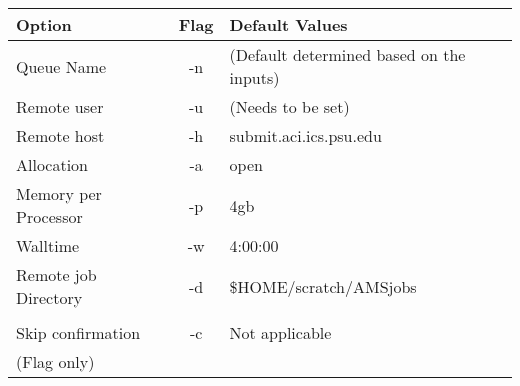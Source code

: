 \begin{table}[H]
    \centering
    \begin{tabular}{|l|c|l|}
    \hline
    Option               & \multicolumn{1}{l|}{Flag} & Default Values                           \\ \hline
    Queue Name           & -n                        & (Default determined based on the inputs) \\
    Remote user          & -u                        & (Needs to be set)                        \\
    Remote host          & -h                        & submit.aci.ics.psu.edu                   \\
    Allocation           & -a                        & open                                     \\
    Memory per Processor & -p                        & 4gb                                      \\
    Walltime             & -w                        & 4:00:00                                  \\
    Remote job Directory & -d   & \$HOME/scratch/AMSjobs                   \\
     & & \\
     Skip confirmation & -c & Not applicable \\
     (Flag only) & & \\ \hline
    \end{tabular}
\end{table}